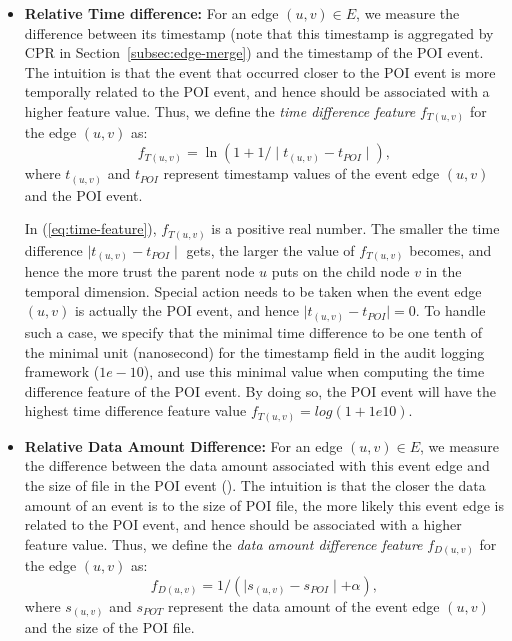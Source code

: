 \begin{itemize}[noitemsep, topsep=1pt, partopsep=1pt, listparindent=\parindent, leftmargin=*]

\item \textbf{Relative Time difference:}
For an edge $(u, v)\in E$, we measure the difference between its timestamp (note that this timestamp is aggregated by CPR in Section~\ref{subsec:edge-merge}) and the timestamp of the POI event.
The intuition is that the event that occurred closer to the POI event is more temporally related to the POI event, and hence should be associated with a higher feature value. 
Thus, we define the \emph{time difference feature} $f_{T(u, v)}$ for the edge $(u, v)$ as:
\begin{equation}
\label{eq:time-feature}
    f_{T(u, v)} = \ln(1 + 1/\mid t_{(u, v)} - t_{POI}\mid),
\end{equation}
where $t_{(u, v)}$ and $t_{POI}$ represent timestamp values 
of the event edge $(u, v)$ and the POI event.

In (\ref{eq:time-feature}), $f_{T(u, v)}$ is a positive real number. The smaller the time difference $\mid t_{(u, v)} - t_{POI}\mid$ gets, the larger the value of $f_{T(u, v)}$ becomes, and hence the more trust the parent node $u$ puts on the child node $v$ in the temporal dimension.
Special action needs to be taken when the event edge $(u, v)$ is actually the POI event, and hence $\mid t_{(u, v)} - t_{POI}\mid = 0$. To handle such a case, we specify that the minimal time difference to be one tenth of the minimal unit (\ie nanosecond) for the timestamp field in the audit logging framework (\ie $1e-10$), and use this minimal value when computing the time difference feature of the POI event. By doing so, the POI event will have the highest time difference feature value $f_{T(u, v)} = log(1 + 1e10)$.


\item \textbf{Relative Data Amount Difference:}
For an edge $(u, v)\in E$, we measure the difference between the data amount associated with this event edge and the size of file in the POI event (\eg{}).
The intuition is that the closer the data amount of an event is to the size of POI file, the more likely this event edge is related to the POI event, and hence should be associated with a higher feature value. Thus, we define the \emph{data amount difference feature} $f_{D(u, v)}$ for the edge $(u, v)$ as:
\begin{equation}
\label{eq:data-feature}
    f_{D(u, v)} = 1/(\mid s_{(u, v)} - s_{POI}\mid + \alpha),
\end{equation}
where $s_{(u, v)}$ and $s_{POT}$ represent the data amount of the event edge $(u, v)$ and the size of the POI file.


\end{itemize}
